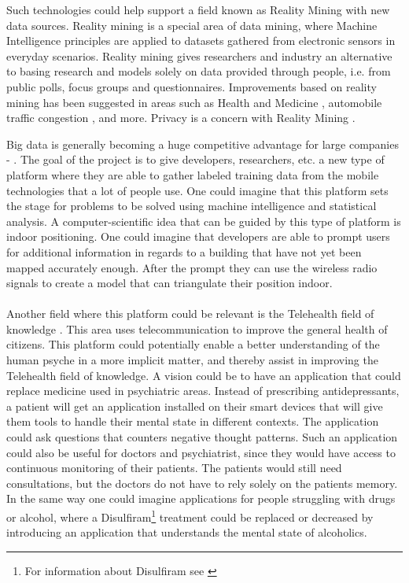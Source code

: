 Such technologies could help support a field known as Reality Mining \parencite{eagle2006_reality_mining_definition} with new data sources. Reality mining is a special area of data mining, where Machine Intelligence principles are applied to datasets gathered from electronic sensors in everyday scenarios. Reality mining gives researchers and industry an alternative to basing research and models solely on data provided through people, i.e. from public polls, focus groups and questionnaires. Improvements based on reality mining has been suggested in areas such as Health and Medicine \parencite{pentland2009_reality_mining_health_medicine}, automobile traffic congestion \parencite{pentland2009reality_mining_mobile_communication_gps}, and more. Privacy is a concern with Reality Mining \parencite{madan2009_reality_mining_privacy}.      



Big data is generally becoming a huge competitive advantage for large companies - \parencite{lavalle2011big}. The goal of the project is to give developers, researchers, etc. a new type of platform where they are able to gather labeled training data from the mobile technologies that a lot of people use. One could imagine that this platform sets the stage for problems to be solved using machine intelligence and statistical analysis. A computer-scientific idea that can be guided by this type of platform is indoor positioning. One could imagine that developers are able to prompt users for additional information in regards to a building that have not yet been mapped accurately enough. After the prompt they can use the wireless radio signals to create a model that can triangulate their position indoor. 
\\\\
Another field where this platform could be relevant is the Telehealth field of knowledge \parencite{telehealth_aau}. This area uses telecommunication to improve the general health of citizens. This platform could potentially enable a better understanding of the human psyche in a more implicit matter, and thereby assist in improving the Telehealth field of knowledge. A vision could be to have an application that could replace medicine used in psychiatric areas. Instead of prescribing antidepressants, a patient will get an application installed on their smart devices that will give them tools to handle their mental state in different contexts. The application could ask questions that counters negative thought patterns. Such an application could also be useful for doctors and psychiatrist, since they would have access to continuous monitoring of their patients. The patients would still need consultations, but the doctors do not have to rely solely on the patients memory. In the same way one could imagine applications for people struggling with drugs or alcohol, where a Disulfiram\footnote{For information about Disulfiram see \textcite{nlm_disulfiram}} treatment could be replaced or decreased by introducing an application that understands the mental state of alcoholics.
